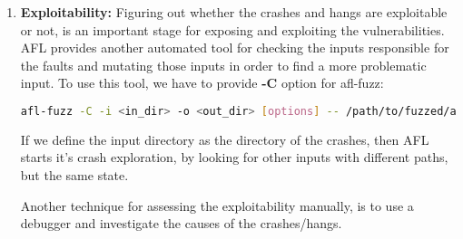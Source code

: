 \begin{enumerate}
    \item \textbf{Exploitability:} Figuring out whether the crashes and hangs are exploitable or not, is an important stage for exposing and exploiting the vulnerabilities. AFL provides another automated tool for checking the inputs responsible for the faults and mutating those inputs in order to find a more problematic input. To use this tool, we have to provide \textbf{-C} option for afl-fuzz:
    
    \begin{lstlisting}[language=bash,style=CommandStyle,caption=AFL Crash Triage]
afl-fuzz -C -i <in_dir> -o <out_dir> [options] -- /path/to/fuzzed/app [params]
    \end{lstlisting}

    If we define the input directory as the directory of the crashes, then AFL starts it's crash exploration, by looking for other inputs with different paths, but the same state. 

    Another technique for assessing the exploitability manually, is to use a debugger and investigate the causes of the crashes/hangs.
    
\end{enumerate}




